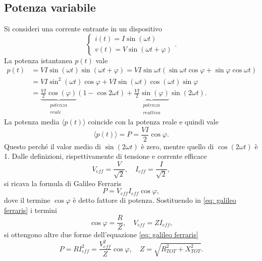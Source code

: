 \subsection{Potenza variabile}
Si consideri una corrente entrante in un dispositivo
\begin{equation}
    \begin{cases}
        i(t)=I\sin{(\omega t)} \\
        v(t)=V\sin{(\omega t+\varphi)}
    \end{cases}.
\end{equation}
La potenza istantanea $p(t)$ vale
\begin{equation}
\begin{split}
    p(t)&=VI\sin{(\omega t)}\sin{(\omega t+\varphi)}=VI\sin{\omega t}(\sin{\omega t}\cos{\varphi}+\sin{\varphi}\cos{\omega t})\\
        &=VI\sin^2{(\omega t)}\cos{\varphi}+VI\sin{(\omega t)}\cos{(\omega t)}\sin{\varphi} \\
        &=\underbrace{\frac{VI}{2}\cos{(\varphi)}}_{\substack{potenza \\ reale}}(1-\cos{2\omega t})+\underbrace{\frac{VI}{2}\sin{(\varphi)}}_{\substack{potenza \\ reattiva}}\sin{(2\omega t)}.
\end{split}
\end{equation}
La potenza media $\langle p(t)\rangle$ coincide con la potenza reale e quindi vale
\begin{equation}
    \langle p(t)\rangle=P=\frac{VI}{2}\cos{\varphi}.
\end{equation}
Questo perché il valor medio di $\sin{(2\omega t)}$ è zero, mentre quello di $\cos{(2\omega t)}$ è 1. Dalle definizioni, rispettivamente di tensione e corrente efficace
\begin{equation}
    V_{eff}=\dfrac{V}{\sqrt{2}},\quad I_{eff}=\dfrac{I}{\sqrt{2}},
\end{equation}
si ricava la formula di Galileo Ferraris 
\begin{equation}
    \label{eq: galileo ferraris}
    P=V_{eff}I_{eff}\cos{\varphi},
\end{equation}
dove il termine $\cos{\varphi}$ è detto fattore di potenza. Sostituendo in \eqref{eq: galileo ferraris} i termini
\begin{equation}
    \cos{\varphi}=\dfrac{R}{Z},\quad V_{eff}=ZI_{eff},
\end{equation}
si ottengono altre due forme dell'equazione \eqref{eq: galileo ferraris}
\begin{equation}
    \label{eq: galileo ferraris 2}
        P=RI_{eff}^2=\dfrac{V_{eff}^2}{Z}\cos{\varphi},\quad Z=\sqrt{R_{TOT}^2+X_{TOT}^2}.
\end{equation}
